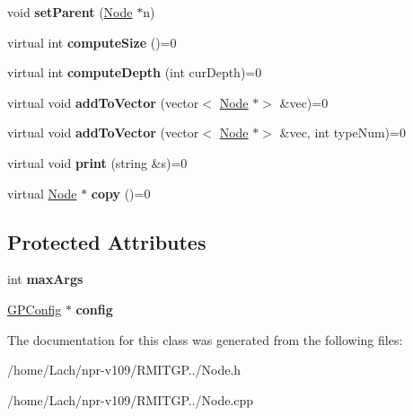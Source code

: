 \begin{DoxyCompactItemize}
void {\bfseries set\+Parent} (\hyperlink{classNode}{Node} $\ast$n)
\item 
\hypertarget{classNode_a465c78ca0653d656c4b6be729a01e619}{}\label{classNode_a465c78ca0653d656c4b6be729a01e619} 
virtual int {\bfseries compute\+Size} ()=0
\item 
\hypertarget{classNode_a736c8c6ff2675222fffb054c8b5e71cf}{}\label{classNode_a736c8c6ff2675222fffb054c8b5e71cf} 
virtual int {\bfseries compute\+Depth} (int cur\+Depth)=0
\item 
\hypertarget{classNode_ae18241c6519adc9a20d2187a46c0dc6e}{}\label{classNode_ae18241c6519adc9a20d2187a46c0dc6e} 
virtual void {\bfseries add\+To\+Vector} (vector$<$ \hyperlink{classNode}{Node} $\ast$$>$ \&vec)=0
\item 
\hypertarget{classNode_a2c1e22a28cacaf7a1033377574b4ed23}{}\label{classNode_a2c1e22a28cacaf7a1033377574b4ed23} 
virtual void {\bfseries add\+To\+Vector} (vector$<$ \hyperlink{classNode}{Node} $\ast$$>$ \&vec, int type\+Num)=0
\item 
\hypertarget{classNode_a62fe30e16e81b24c73cf93b1577de5c0}{}\label{classNode_a62fe30e16e81b24c73cf93b1577de5c0} 
virtual void {\bfseries print} (string \&s)=0
\item 
\hypertarget{classNode_a3f9b0b2b5678e23f143c9fdaaf3e8c5c}{}\label{classNode_a3f9b0b2b5678e23f143c9fdaaf3e8c5c} 
virtual \hyperlink{classNode}{Node} $\ast$ {\bfseries copy} ()=0
\end{DoxyCompactItemize}
\subsection*{Protected Attributes}
\begin{DoxyCompactItemize}
\item 
\hypertarget{classNode_afc05e3b5c6bf0eace3fd8d8df8a15c7c}{}\label{classNode_afc05e3b5c6bf0eace3fd8d8df8a15c7c} 
int {\bfseries max\+Args}
\item 
\hypertarget{classNode_ae0353541456b3dcd4ed5521cbe7215fc}{}\label{classNode_ae0353541456b3dcd4ed5521cbe7215fc} 
\hyperlink{classGPConfig}{G\+P\+Config} $\ast$ {\bfseries config}
\end{DoxyCompactItemize}


The documentation for this class was generated from the following files\+:\begin{DoxyCompactItemize}
\item 
/home/\+Lach/npr-\/v109/\+R\+M\+I\+T\+G\+P../Node.\+h\item 
/home/\+Lach/npr-\/v109/\+R\+M\+I\+T\+G\+P../Node.\+cpp\end{DoxyCompactItemize}
